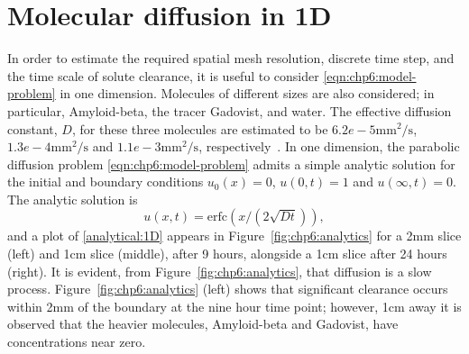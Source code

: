 
\section{Molecular diffusion in 1D}\label{sec:chp6:1D-tests}
In order to estimate the required spatial mesh resolution, discrete time step, 
and the time scale of solute clearance, it is useful to consider 
\eqref{eqn:chp6:model-problem} in one dimension.  Molecules of different sizes 
are also considered; in particular, Amyloid-beta, the tracer Gadovist, and water.  
The effective diffusion constant, $D$, for these three molecules are estimated to 
be $6.2e-5 \mbox{mm}^2/\mbox{s}$, $1.3e-4 \mbox{mm}^2/\mbox{s}$ and 
$1.1e-3 \mbox{mm}^2/\mbox{s}$, respectively~\cite{waters2010concentration,valnes2020apparent}. 
In one dimension, the parabolic diffusion problem \eqref{eqn:chp6:model-problem} 
admits a simple analytic solution for the initial and boundary conditions 
$u_0(x)=0$, $u(0,t)=1$ and $u(\infty,t)=0$.  The analytic solution is 
\begin{equation}
\label{analytical:1D}
u(x,t) =  \mbox{erfc}(x / (2 \sqrt{D t})),
\end{equation}
and a plot of \eqref{analytical:1D} appears in Figure~\ref{fig:chp6:analytics} 
for a 2mm slice (left) and 1cm slice (middle), after 9 hours, alongside a 1cm slice 
after 24 hours (right).  It is evident, from Figure~\ref{fig:chp6:analytics}, that 
diffusion is a slow process.  Figure~\ref{fig:chp6:analytics} (left) shows that 
significant clearance occurs within 2mm of the boundary at the nine hour time point; 
however, 1cm away it is observed that the heavier molecules, Amyloid-beta and Gadovist, 
have concentrations near zero.  
